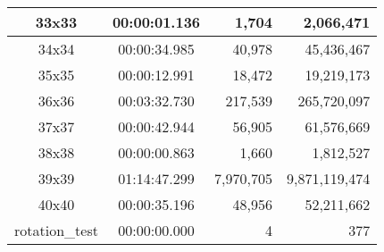 \begin{center}
\begin{tabular}{|c|c|r|r|}
		33x33 & 00:00:01.136 & 1,704 & 2,066,471 \\ \hline
		34x34 & 00:00:34.985 & 40,978 & 45,436,467 \\ \hline
		35x35 & 00:00:12.991 & 18,472 & 19,219,173 \\ \hline
		36x36 & 00:03:32.730 & 217,539 & 265,720,097 \\ \hline
		37x37 & 00:00:42.944 & 56,905 & 61,576,669 \\ \hline
		38x38 & 00:00:00.863 & 1,660 & 1,812,527 \\ \hline
		39x39 & 01:14:47.299 & 7,970,705 & 9,871,119,474 \\ \hline
		40x40 & 00:00:35.196 & 48,956 & 52,211,662 \\ \hline
		rotation\_test & 00:00:00.000 & 4 & 377 \\ \hline

    \end{tabular}
\end{center}
